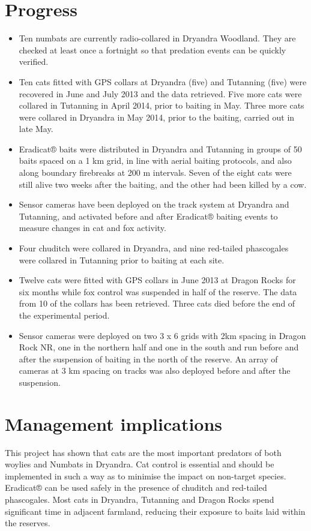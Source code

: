 \documentclass[version=last,
    paper=a4, %
    10pt, %
    usenames,
    dvipsnames,
    oneside, %
    headings=openany, %
    DIV=15 %
]{scrbook}
\begin{document}
\section*{Progress}
\begin{itemize}
\itemsep1pt\parskip0pt
\item
  Ten numbats are currently radio-collared in Dryandra Woodland. They
  are checked at least once a fortnight so that predation events can be
  quickly verified.
\item
  Ten cats fitted with GPS collars at Dryandra (five) and Tutanning
  (five) were recovered in June and July 2013 and the data retrieved.
  Five more cats were collared in Tutanning in April 2014, prior to
  baiting in May. Three more cats were collared in Dryandra in May 2014,
  prior to the baiting, carried out in late May.
\item
  Eradicat® baits were distributed in Dryandra and Tutanning in groups
  of 50 baits spaced on a 1 km grid, in line with aerial baiting
  protocols, and also along boundary firebreaks at 200 m intervals.
  Seven of the eight cats were still alive two weeks after the baiting,
  and the other had been killed by a cow.
\item
  Sensor cameras have been deployed on the track system at Dryandra and
  Tutanning, and activated before and after Eradicat® baiting events to
  measure changes in cat and fox activity.
\item
  Four chuditch were collared in Dryandra, and nine red-tailed
  phascogales were collared in Tutanning prior to baiting at each site.
\item
  Twelve cats were fitted with GPS collars in June 2013 at Dragon Rocks
  for six months while fox control was suspended in half of the reserve.
  The data from 10 of the collars has been retrieved. Three cats died
  before the end of the experimental period.
\item
  Sensor cameras were deployed on two 3 x 6 grids with 2km spacing in
  Dragon Rock NR, one in the northern half and one in the south and run
  before and after the suspension of baiting in the north of the
  reserve. An array of cameras at 3 km spacing on tracks was also
  deployed before and after the suspension.
\end{itemize}



\section*{Management implications}
This project has shown that cats are the most important predators of
both woylies and Numbats in Dryandra. Cat control is essential and
should be implemented in such a way as to minimise the impact on
non-target species. Eradicat® can be used safely in the presence of
chuditch and red-tailed phascogales. Most cats in Dryandra, Tutanning
and Dragon Rocks spend significant time in adjacent farmland, reducing
their exposure to baits laid within the reserves.
\end{document}
